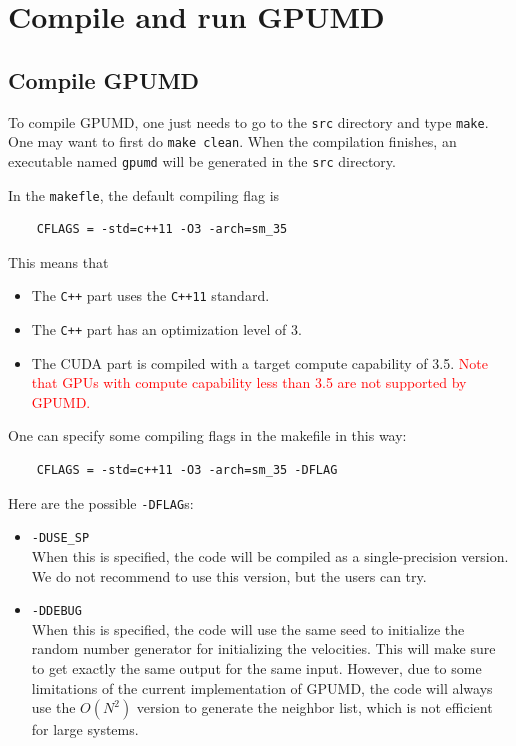 \documentclass[12pt,a4paper]{report}
\begin{document}
\section{Compile and run GPUMD}

\subsection{Compile GPUMD}

To compile GPUMD, one just needs to go to the \verb"src" directory and type \verb"make". One may want to first do \verb"make clean". When the compilation finishes, an executable named \verb"gpumd" will be generated in the \verb"src" directory.

In the \verb"makefle", the default compiling flag is
\begin{verbatim}
    CFLAGS = -std=c++11 -O3 -arch=sm_35
\end{verbatim}
This means that
\begin{itemize}
\item The \verb"C++" part uses the \verb"C++11" standard.
\item The \verb"C++" part has an optimization level of 3.
\item The CUDA part is compiled with a target compute capability of 3.5. \textcolor{red}{Note that GPUs with compute capability less than 3.5 are not supported by GPUMD.}
\end{itemize}

One can specify some compiling flags in the makefile in this way:
\begin{verbatim}
    CFLAGS = -std=c++11 -O3 -arch=sm_35 -DFLAG
\end{verbatim}
Here are the possible \verb"-DFLAG"s:
\begin{itemize}
\item \verb"-DUSE_SP"\\
When this is specified, the code will be compiled as a single-precision version. We do not recommend to use this version, but the users can try.
\item \verb"-DDEBUG"\\
When this is specified, the code will use the same seed to initialize the random number generator for initializing the velocities. This will make sure to get exactly the same output for the same input. However, due to some limitations of the current implementation of GPUMD, the code will always use the $O(N^2)$ version to generate the neighbor list, which is not efficient for large systems. 
\end{itemize}
\end{document}
